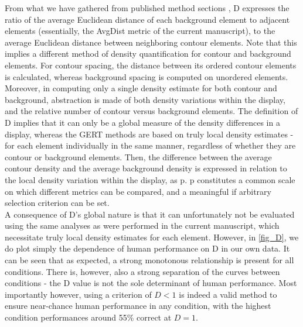 \documentclass[12pt]{article}
\begin{document}
From what we have gathered from published method sections \cite{Kovacs99,KovacsPolat00,Silverstein00,Silverstein09}, D expresses the ratio of the average Euclidean distance of each background element to adjacent elements (essentially, the AvgDist metric of the current manuscript), to the average Euclidean distance between neighboring contour elements. Note that this implies a different method of density quantification for contour and background elements. For contour spacing, the distance between its ordered contour elements is calculated, whereas background spacing is computed on unordered elements. Moreover, in computing only a single density estimate for both contour and background, abstraction is made of both density variations within the display, and the relative number of contour versus background elements. The definition of D implies that it can only be a global measure of the density differences in a display, whereas the GERT methods are based on truly local density estimates - for each element individually in the same manner, regardless of whether they are contour or background elements. Then, the difference between the average contour density and the average background density is expressed in relation to the local density variation within the display, as p. p constitutes a common scale on which different metrics can be compared, and a meaningful if arbitrary selection criterion can be set.\\

A consequence of D's global nature is that it can unfortunately not be evaluated using the same analyses as were performed in the current manuscript, which necessitate truly local density estimates for each element. However, in \autoref{fig_D}, we do plot simply the dependence of human performance on D in our own data. It can be seen that as expected, a strong monotonous relationship is present for all conditions. There is, however, also a strong separation of the curves between conditions - the D value is not the sole determinant of human performance. Most importantly however, using a criterion of $D<1$ is indeed a valid method to ensure near-chance human performance in any condition, with the highest condition performances around 55\% correct at $D=1$.\\
\end{document}
